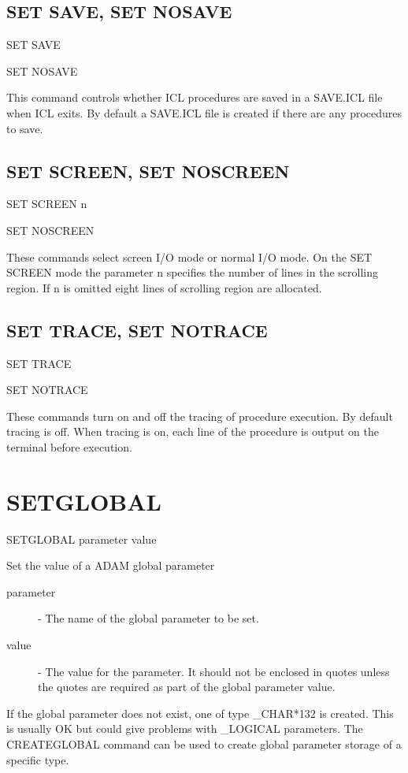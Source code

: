 \documentclass[twoside,11pt]{report}
\newcommand{\xlabel}[1]{}
\begin{document}
\subsection{\xlabel{SET_SAVE}SET SAVE, SET NOSAVE\label{SET_SAVE}}

   SET SAVE

   SET NOSAVE

This command controls whether ICL procedures are saved in a SAVE.ICL file
when ICL exits. By default a SAVE.ICL file is created if there are any
procedures to save. 

\subsection{\xlabel{SET_SCREEN}SET SCREEN, SET NOSCREEN\label{SET_SCREEN}}

   SET SCREEN n

   SET NOSCREEN

These commands select screen I/O mode or normal I/O mode. On the SET SCREEN
mode the parameter n specifies the number of lines in the scrolling region.
If n is omitted eight lines of scrolling region are allocated.

\subsection{\xlabel{SET_TRACE}SET TRACE, SET NOTRACE\label{SET_TRACE}}

   SET TRACE

   SET NOTRACE

These commands turn on and off the tracing of procedure execution. By 
default tracing is off. When tracing is on, each line of the procedure is 
output on the terminal before execution.



\section{\xlabel{SETGLOBAL}SETGLOBAL\label{SETGLOBAL}}

   SETGLOBAL \hspace{.5cm}  parameter \hspace{.5cm} value

Set the value of a ADAM global parameter

\begin{description}

\item[parameter] - The name of the global parameter to be set.

\item[value] - The value for the parameter. It should not be enclosed in quotes
unless the quotes are required as part of the global parameter value.

\end{description}
If the global parameter does not exist, one of type \_CHAR*132 is created.
This is usually OK but could give problems with \_LOGICAL parameters.
The CREATEGLOBAL command can be used to create global parameter storage of a 
specific type.
\end{document}
